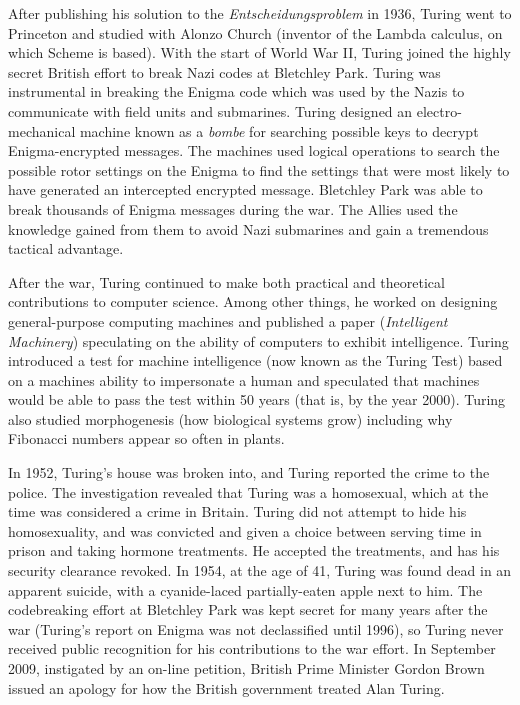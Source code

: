 \begin{schemeregion}
{After publishing his solution to the \emph{Entscheidungsproblem} in 1936, Turing went to Princeton and studied with Alonzo Church (inventor of the Lambda calculus, on which Scheme is based).  With the start of World War II, Turing joined the highly secret British effort to break Nazi codes at Bletchley Park.  Turing was instrumental in breaking the Enigma code which was used by the Nazis to communicate with field units and submarines.  Turing designed an electro-mechanical machine known as a \emph{bombe} for searching possible keys to decrypt Enigma-encrypted messages.  
The machines used logical operations to search the possible rotor settings on the Enigma to find the settings that were most likely to have generated an intercepted encrypted message. Bletchley Park was able to break thousands of Enigma messages during the war.  The Allies used the knowledge gained from them to avoid Nazi submarines and gain a tremendous tactical advantage.
 
After the war, Turing continued to make both practical and theoretical contributions to computer science.  Among other things, he worked on designing general-purpose computing machines and published a paper (\emph{Intelligent Machinery}) speculating on the ability of computers to exhibit intelligence.  Turing introduced a test for machine intelligence (now known as the Turing Test) based on a machines ability to impersonate a human and speculated that machines would be able to pass the test within 50 years (that is, by the year 2000).  Turing also studied morphogenesis (how biological systems grow) including why Fibonacci numbers appear so often in plants.

In 1952, Turing's house was broken into, and Turing reported the crime to the police.  The investigation revealed that Turing was a homosexual, which at the time was considered a crime in Britain.  Turing did not attempt to hide his homosexuality, and was convicted and given a choice between serving time in prison and taking hormone treatments. He accepted the treatments, and has his security clearance revoked.  In 1954, at the age of 41, Turing was found dead in an apparent suicide, with a cyanide-laced partially-eaten apple next to him.  The codebreaking effort at Bletchley Park was kept secret for many years after the war (Turing's report on Enigma was not declassified until 1996), so Turing never received public recognition for his contributions to the war effort.  In September 2009, instigated by an on-line petition, British Prime Minister Gordon Brown issued an apology for how the British government treated Alan Turing.
}


\end{schemeregion}
